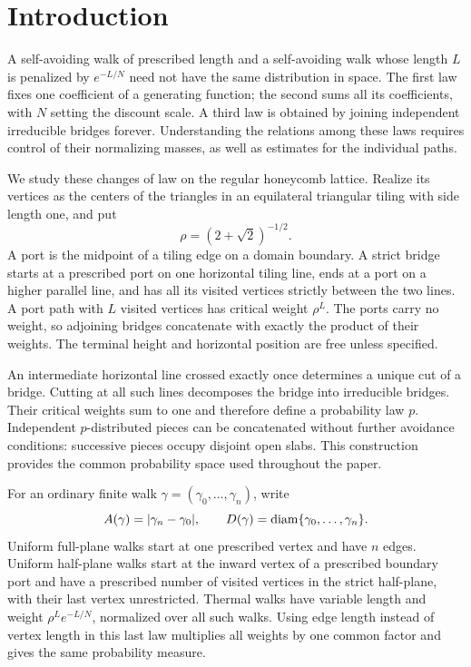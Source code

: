 \section{Introduction}
A self-avoiding walk of prescribed length and a self-avoiding walk whose length $L$ is penalized by $e^{-L/N}$ need not have the same distribution in space. The first law fixes one coefficient of a generating function; the second sums all its coefficients, with $N$ setting the discount scale. A third law is obtained by joining independent irreducible bridges forever. Understanding the relations among these laws requires control of their normalizing masses, as well as estimates for the individual paths.

We study these changes of law on the regular honeycomb lattice. Realize its vertices as the centers of the triangles in an equilateral triangular tiling with side length one, and put
\[
 \rho=(2+\sqrt2)^{-1/2}.
\]
A port is the midpoint of a tiling edge on a domain boundary. A strict bridge starts at a prescribed port on one horizontal tiling line, ends at a port on a higher parallel line, and has all its visited vertices strictly between the two lines. A port path with $L$ visited vertices has critical weight $\rho^L$. The ports carry no weight, so adjoining bridges concatenate with exactly the product of their weights. The terminal height and horizontal position are free unless specified.

An intermediate horizontal line crossed exactly once determines a unique cut of a bridge. Cutting at all such lines decomposes the bridge into irreducible bridges. Their critical weights sum to one and therefore define a probability law $p$. Independent $p$-distributed pieces can be concatenated without further avoidance conditions: successive pieces occupy disjoint open slabs. This construction provides the common probability space used throughout the paper.

For an ordinary finite walk $\gamma=(\gamma_0,\ldots,\gamma_n)$, write
\[
 A(\gamma)=|\gamma_n-\gamma_0|,
 \qquad D(\gamma)=\operatorname{diam}\{\gamma_0,\ldots,\gamma_n\}.
\]
Uniform full-plane walks start at one prescribed vertex and have $n$ edges. Uniform half-plane walks start at the inward vertex of a prescribed boundary port and have a prescribed number of visited vertices in the strict half-plane, with their last vertex unrestricted. Thermal walks have variable length and weight $\rho^L e^{-L/N}$, normalized over all such walks. Using edge length instead of vertex length in this last law multiplies all weights by one common factor and gives the same probability measure.

